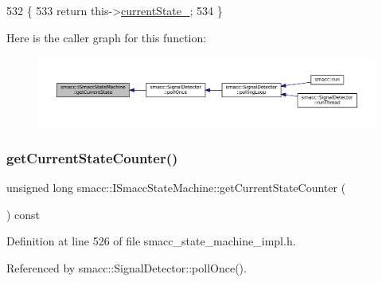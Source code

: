 \begin{DoxyCode}
532   \{
533     \textcolor{keywordflow}{return} this->\hyperlink{classsmacc_1_1ISmaccStateMachine_a9c6e7745205bcce80a301f2fbe8f7e99}{currentState\_};
534   \}
\end{DoxyCode}
Here is the caller graph for this function\+:
\nopagebreak
\begin{figure}[H]
\begin{center}
\leavevmode
\includegraphics[width=350pt]{classsmacc_1_1ISmaccStateMachine_a610d09dc5341fb63732be713c21fbe86_icgraph}
\end{center}
\end{figure}
\mbox{\label{classsmacc_1_1ISmaccStateMachine_aad27c0182b53245d0aded22e63cd83bd}} 
\subsubsection{\texorpdfstring{get\+Current\+State\+Counter()}{getCurrentStateCounter()}}
{\footnotesize\ttfamily unsigned long smacc\+::\+I\+Smacc\+State\+Machine\+::get\+Current\+State\+Counter (\begin{DoxyParamCaption}{ }\end{DoxyParamCaption}) const\hspace{0.3cm}{\ttfamily [inline]}}



Definition at line 526 of file smacc\+\_\+state\+\_\+machine\+\_\+impl.\+h.



Referenced by smacc\+::\+Signal\+Detector\+::poll\+Once().


